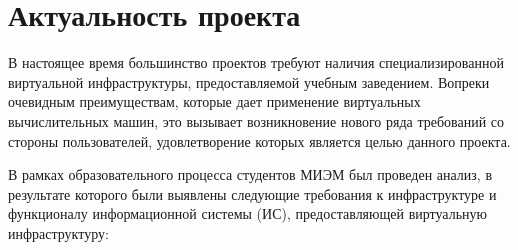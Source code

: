 \documentclass[14pt, a4paper]{extarticle}
\begin{document}

\tableofcontents

\pagebreak


\section{Актуальность проекта}

В настоящее время большинство проектов требуют наличия специализированной виртуальной инфраструктуры, предоставляемой учебным заведением. Вопреки очевидным преимуществам, которые дает применение виртуальных вычислительных машин, это вызывает возникновение нового ряда требований со стороны пользователей, удовлетворение которых является целью данного проекта.

В рамках образовательного процесса студентов МИЭМ был проведен анализ, в результате которого были выявлены следующие требования к инфраструктуре и функционалу информационной системы (ИС), предоставляющей виртуальную инфраструктуру:
\end{document}
